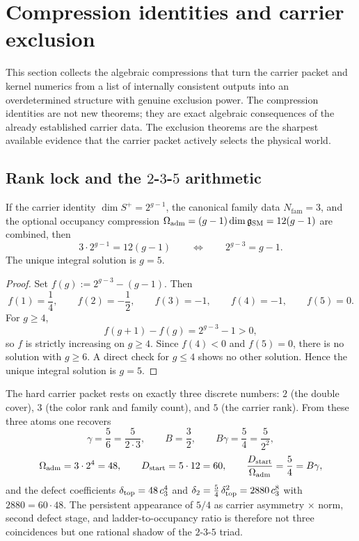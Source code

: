 \section{Compression identities and carrier exclusion}

This section collects the algebraic compressions that turn the carrier packet and kernel numerics from a list of internally consistent outputs into an overdetermined structure with genuine exclusion power. The compression identities are not new theorems; they are exact algebraic consequences of the already established carrier data. The exclusion theorems are the sharpest available evidence that the carrier packet actively selects the physical world.

\subsection{Rank lock and the \texorpdfstring{$2$-$3$-$5$}{2-3-5} arithmetic}

\begin{proposition}
\label{prop:rank-lock}
If the carrier identity $\dim S^+=2^{g-1}$, the canonical family data $N_{\mathrm{fam}}=3$, and the optional occupancy compression $\Omega_{\mathrm{adm}}=(g-1)\dim\mathfrak g_{\mathrm{SM}}=12(g-1)$ are combined, then
\begin{equation}
\label{eq:rank-lock}
3\cdot 2^{g-1}=12(g-1)
\qquad\Longleftrightarrow\qquad
2^{g-3}=g-1.
\end{equation}
The unique integral solution is $g=5$.
\end{proposition}

\begin{proof}
Set $f(g):=2^{g-3}-(g-1)$. Then
\[
f(1)=\frac14,\qquad
f(2)=-\frac12,\qquad
f(3)=-1,\qquad
f(4)=-1,\qquad
f(5)=0.
\]
For $g\ge 4$,
\[
f(g+1)-f(g)=2^{g-3}-1>0,
\]
so $f$ is strictly increasing on $g\ge 4$. Since $f(4)<0$ and $f(5)=0$, there is no solution with $g\ge 6$. A direct check for $g\le 4$ shows no other solution. Hence the unique integral solution is $g=5$.
\end{proof}

\begin{remark}
The hard carrier packet rests on exactly three discrete numbers: $2$ (the double cover), $3$ (the color rank and family count), and $5$ (the carrier rank). From these three atoms one recovers
\[
\gamma=\frac{5}{6}=\frac{5}{2\cdot 3},
\qquad
B=\frac{3}{2},
\qquad
B\gamma=\frac{5}{4}=\frac{5}{2^2},
\]
\[
\Omega_{\mathrm{adm}}=3\cdot 2^4=48,
\qquad
D_{\mathrm{start}}=5\cdot 12=60,
\qquad
\frac{D_{\mathrm{start}}}{\Omega_{\mathrm{adm}}}=\frac{5}{4}=B\gamma,
\]
and the defect coefficients $\delta_{\mathrm{top}}=48\,c_3^4$ and $\delta_2=\frac54\,\delta_{\mathrm{top}}^2=2880\,c_3^8$ with $2880=60\cdot 48$.
The persistent appearance of $5/4$ as carrier asymmetry $\times$ norm, second defect stage, and ladder-to-occupancy ratio is therefore not three coincidences but one rational shadow of the $2$-$3$-$5$ triad.
\end{remark}

